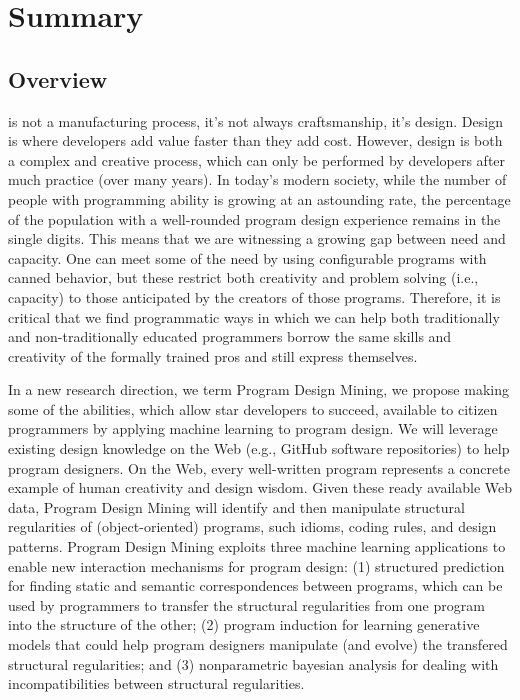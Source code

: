 \chapter{Summary}{}
\label{sec:intro}

\section*{Overview} %
\label{sec:overview}

 is not a manufacturing process, it's not 
always craftsmanship, it's design. Design is where developers add 
value faster than they add cost. However, design is both a complex 
and creative process, which can only be performed by developers after 
much practice (over many years). In today’s modern society, while the 
number of people with programming ability is growing at an astounding 
rate, the percentage of the population with a well-rounded program 
design experience remains in the single digits. This means that we are 
witnessing a growing gap between need and capacity. One can meet some of 
the need by using configurable programs with canned behavior, but these 
restrict both creativity and problem solving (i.e., capacity) to those 
anticipated by the creators of those programs. Therefore, it is critical 
that we find programmatic ways in which we can help both traditionally 
and non-traditionally educated programmers borrow the same skills and 
creativity of the formally trained pros and still express themselves.

In a new research direction, we term Program Design Mining, we propose  
making some of the abilities, which allow star developers to succeed, 
available to citizen programmers by applying machine learning to program 
design. We will leverage existing design knowledge on the Web (e.g., 
GitHub software repositories) to help program designers. On the Web, 
every well-written program represents a concrete example of human 
creativity and design wisdom. Given these ready available Web data, 
Program Design Mining will identify and then manipulate structural 
regularities \cite{minsky1991law} of (object-oriented) programs, such idioms, 
coding rules, and design patterns. Program Design Mining exploits three machine 
learning applications to enable new interaction mechanisms for program 
design: (1) structured prediction \cite{collins2002discriminative} for 
finding static and semantic correspondences between programs, which can 
be used by programmers to transfer the structural regularities from one 
program into the structure of the other; (2) program induction \cite{lake2015human} 
for learning generative models that could help program designers manipulate 
(and evolve) the transfered structural regularities; and (3) nonparametric 
bayesian analysis \cite{allamanis2014mining} for dealing with incompatibilities 
between structural regularities.

